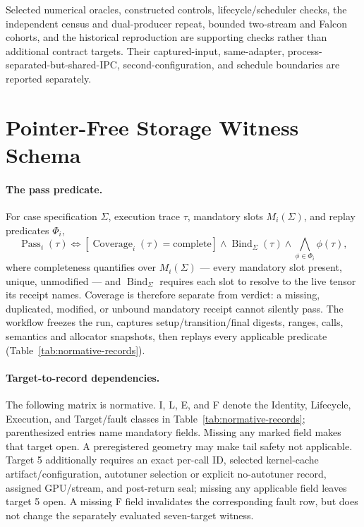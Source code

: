 \documentclass{article}
\begin{document}
Selected numerical oracles, constructed controls, lifecycle/scheduler checks,
the independent census and dual-producer repeat, bounded two-stream and Falcon
cohorts, and the historical reproduction are supporting checks rather than
additional contract targets.  Their captured-input, same-adapter,
process-separated-but-shared-IPC, second-configuration, and schedule boundaries
are reported separately.

\section{Pointer-Free Storage Witness Schema}
\label{app:storage-schema}

\paragraph{The pass predicate.}
For case specification \(\Sigma\), execution trace \(\tau\), mandatory slots
\(M_i(\Sigma)\), and replay predicates \(\Phi_i\),
\begin{equation}
  \operatorname{Pass}_i(\tau)\Longleftrightarrow
  [\operatorname{Coverage}_i(\tau)=\mathrm{complete}]
  \wedge\operatorname{Bind}_{\Sigma}(\tau)
  \wedge\bigwedge_{\phi\in\Phi_i}\phi(\tau),
\end{equation}
where completeness quantifies over \(M_i(\Sigma)\) --- every mandatory slot
present, unique, unmodified --- and \(\operatorname{Bind}_{\Sigma}\) requires
each slot to resolve to the live tensor its receipt names.  Coverage is therefore
separate from verdict: a missing, duplicated, modified, or unbound mandatory
receipt cannot silently pass.  The workflow freezes the run, captures
setup/transition/final digests, ranges, calls, semantics and allocator snapshots,
then replays every applicable predicate (Table~\ref{tab:normative-records}).

\paragraph{Target-to-record dependencies.}
The following matrix is normative.  I, L, E, and F denote the Identity,
Lifecycle, Execution, and Target/fault classes in Table~\ref{tab:normative-records};
parenthesized entries name mandatory fields.  Missing any marked field makes
that target open.  A preregistered geometry may make tail safety not applicable.
Target 5 additionally requires an exact per-call ID, selected kernel-cache
artifact/configuration, autotuner selection or explicit no-autotuner record,
assigned GPU/stream, and post-return seal; missing any applicable field leaves
target 5 open.  A missing F field invalidates the corresponding fault row,
but does not change the separately evaluated seven-target witness.
\end{document}
